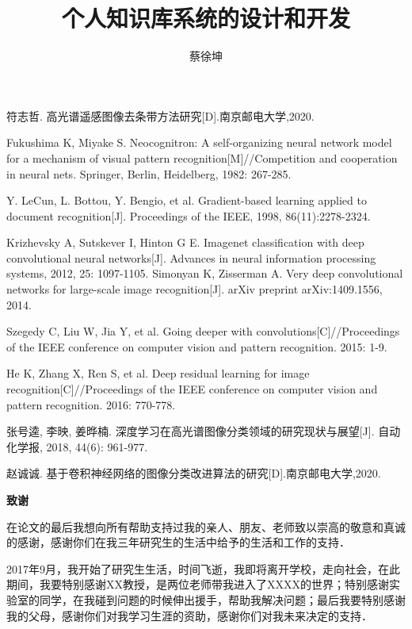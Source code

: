 \documentclass[UTF8,zihao=-4]{oucart}
\title{个人知识库系统的设计和开发}
\author{蔡徐坤}
\begin{document}
\makecover
\makesignature
\makeabstract

\thispagestyle{tableofcontents}
\tableofcontents
\newpage

\setcounter{page}{1}





\begin{thebibliography}{99}
符志哲. 高光谱遥感图像去条带方法研究[D].南京邮电大学,2020.

Fukushima K, Miyake S. Neocognitron: A self-organizing neural network model for a mechanism of visual pattern recognition[M]//Competition and cooperation in neural nets. Springer, Berlin, Heidelberg, 1982: 267-285.

Y. LeCun, L. Bottou, Y. Bengio, et al. Gradient-based learning applied to document recognition[J]. Proceedings of the IEEE, 1998, 86(11):2278-2324.

Krizhevsky A, Sutskever I, Hinton G E. Imagenet classification with deep convolutional neural networks[J]. Advances in neural information processing systems, 2012, 25: 1097-1105.
Simonyan K, Zisserman A. Very deep convolutional networks for large-scale image recognition[J]. arXiv preprint arXiv:1409.1556, 2014.

Szegedy C, Liu W, Jia Y, et al. Going deeper with convolutions[C]//Proceedings of the IEEE conference on computer vision and pattern recognition. 2015: 1-9.

He K, Zhang X, Ren S, et al. Deep residual learning for image recognition[C]//Proceedings of the IEEE conference on computer vision and pattern recognition. 2016: 770-778.

张号逵, 李映, 姜晔楠. 深度学习在高光谱图像分类领域的研究现状与展望[J]. 自动化学报, 2018, 44(6): 961-977.

赵诚诚. 基于卷积神经网络的图像分类改进算法的研究[D].南京邮电大学,2020.

\end{thebibliography}




\newpage
\begin{center}
 \textbf{致谢} \\
\end{center}

在论文的最后我想向所有帮助支持过我的亲人、朋友、老师致以崇高的敬意和真诚的感谢，感谢你们在我三年研究生的生活中给予的生活和工作的支持．

2017年9月，我开始了研究生生活，时间飞逝，我即将离开学校，走向社会，在此期间，我要特别感谢XX教授，是两位老师带我进入了XXXX的世界；特别感谢实验室的同学，在我碰到问题的时候伸出援手，帮助我解决问题；最后我要特别感谢我的父母，感谢你们对我学习生涯的资助，感谢你们对我未来决定的支持．
\end{document}
